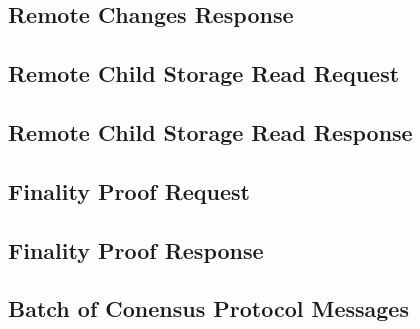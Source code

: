 \documentclass{book}
\begin{document}
\subsection{Remote Changes Response}

\subsection{Remote Child Storage Read Request}

\subsection{Remote Child Storage Read Response}

\subsection{Finality Proof Request}

\subsection{Finality Proof Response}

\subsection{Batch of Conensus Protocol Messages}
\end{document}
